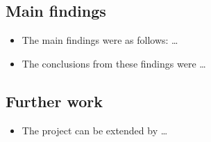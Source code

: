 \documentclass[12pt,a4paper]{article}
\begin{document}
\subsection{Main findings}
\begin{itemize}
    \item The main findings were as follows: \dots
    \item The conclusions from these findings were \dots
\end{itemize}

\subsection{Further work}
\begin{itemize}
    \item The project can be extended by \dots
\end{itemize}

\newpage

\end{document}
